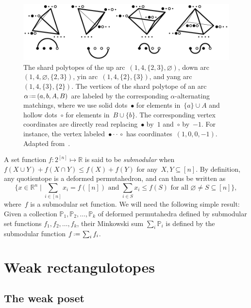 \documentclass{amsart}
\theoremstyle{definition}
\newcommand{\R}{\mathbb{R}} %
\newcommand{\Bigset}[2]{\Big\{ #1 \;\Big|\; #2 \Big\}} %
\newcommand{\eqdef}{\mbox{\,\raisebox{0.2ex}{\scriptsize\ensuremath{\mathrm:}}\ensuremath{=}\,}} %
\newcommand{\darkblue}{\color{darkblue}} %
\newcommand{\defn}[1]{\textsl{\darkblue #1}} %
\newcommand{\polytope}[1]{\mathds{#1}} %
\begin{document}
\begin{figure}
	\capstart
	\centerline{\includegraphics[scale=1]{shardPolytopes}}
	\caption{The shard polytopes of the up arc~$(1, 4, \{2, 3\}, \varnothing)$, down arc~$(1, 4, \varnothing, \{2, 3\})$, yin arc~$(1, 4, \{2\}, \{3\})$, and yang arc~$(1, 4, \{3\}, \{2\})$. The vertices of the shard polytope of an arc~$\alpha \eqdef (a, b, A, B)$ are labeled by the corresponding $\alpha$-alternating matchings, where we use solid dots~$\bullet$ for elements in~$\{a\} \cup A$ and hollow dots~$\circ$ for elements in~$B \cup \{b\}$. The corresponding vertex coordinates are directly read replacing~$\bullet$ by~$1$ and~$\circ$ by~$-1$. For instance, the vertex labeled~${\bullet \cdot \cdot \,\circ}$ has coordinates~$(1,0,0,-1)$. Adapted from~\cite[Fig.~10]{MR4584712}.}
	\label{fig:shardPolytopes}
\end{figure}

A set function $f:2^{[n]}\mapsto \R$ is said to be \defn{submodular} when $f(X \cup Y) + f(X \cap Y) \le f(X) + f(Y)$ for any~$X, Y \subseteq [n]$.
By definition, any quotientope is a deformed permutahedron, and can thus be written as
  \[
  \Bigset{x \in \R^n}{ \sum_{i \in [n]} x_i = f([n]) \text{ and } \sum_{i \in S} x_i \le f(S) \text{ for all } \varnothing \ne S \subseteq [n]},
  \]
where~$f$ is a submodular set function.
We will need the following simple result: Given a collection $\polytope{P}_1, \polytope{P}_2,\ldots ,\polytope{P}_k$ of deformed permutahedra defined by submodular set functions $f_1,f_2,\ldots ,f_k$, their Minkowski sum $\sum_i \polytope{P}_i$ is defined by the submodular function $f \eqdef \sum_i f_i$.


\section{Weak rectangulotopes}
\label{sec:weakRectangulotopes}

\subsection{The weak poset}
\label{subsec:weakPoset}
\end{document}
